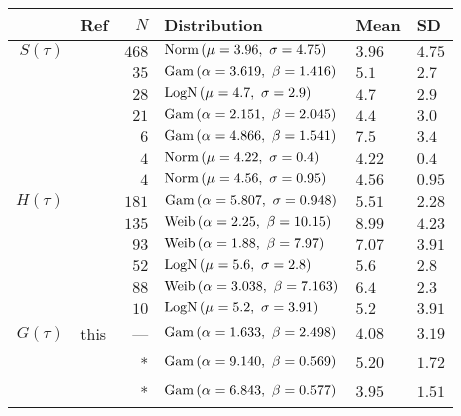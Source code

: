 \centering
{\small
\begin{tabular}{rlrlll}
	\toprule
	          & Ref                 &   $N$ & Distribution                           & Mean   & SD     \\
	\midrule
	$S(\tau)$ & \citet{Du2020}       & $468$ & $\mathop{\mathrm{Norm}}{\left(\mu=3.96,~\sigma=4.75\right)}$     & $3.96$ & $4.75$ \\
	          & \citet{Zhang2020}    &  $35$ & $\mathop{\mathrm{Gam}}{\left(\alpha=3.619,~\beta=1.416\right)}$  & $5.1$  & $2.7$  \\
	          & \citet{Nishiura2020} &  $28$ & $\mathop{\mathrm{LogN}}{\left(\mu=4.7,~\sigma=2.9\right)}$       & $4.7$  & $2.9$  \\
	          & \citet{Zhao2020}     &  $21$ & $\mathop{\mathrm{Gam}}{\left(\alpha=2.151,~\beta=2.045\right)}$  & $4.4$  & $3.0$  \\
	          & \citet{Li2020}       &   $6$ & $\mathop{\mathrm{Gam}}{\left(\alpha=4.866,~\beta=1.541\right)}$  & $7.5$  & $3.4$  \\
	          & \citet{Tindale2020}  &   $4$ & $\mathop{\mathrm{Norm}}{\left(\mu=4.22,~\sigma=0.4\right)}$      & $4.22$ & $0.4$  \\
	          & \citet{Tindale2020}  &   $4$ & $\mathop{\mathrm{Norm}}{\left(\mu=4.56,~\sigma=0.95\right)}$     & $4.56$ & $0.95$ \\
	\midrule
	$H(\tau)$ & \citet{Lauer2020}    & $181$ & $\mathop{\mathrm{Gam}}{\left(\alpha=5.807,~\sigma=0.948\right)}$ & $5.51$ & $2.28$ \\
	          & \citet{Tindale2020}  & $135$ & $\mathop{\mathrm{Weib}}{\left(\alpha=2.25,~\beta=10.15\right)}$  & $8.99$ & $4.23$ \\
	          & \citet{Tindale2020}  &  $93$ & $\mathop{\mathrm{Weib}}{\left(\alpha=1.88,~\beta=7.97\right)}$   & $7.07$ & $3.91$ \\
	          & \citet{Linton2020}   &  $52$ & $\mathop{\mathrm{LogN}}{\left(\mu=5.6,~\sigma=2.8\right)}$       & $5.6$  & $2.8$  \\
	          & \citet{Backer2020}   &  $88$ & $\mathop{\mathrm{Weib}}{\left(\alpha=3.038,~\beta=7.163\right)}$ & $6.4$  & $2.3$  \\
	          & \citet{Li2020}       &  $10$ & $\mathop{\mathrm{LogN}}{\left(\mu=5.2,~\sigma=3.91\right)}$      & $5.2$  & $3.91$ \\
	\midrule
	$G(\tau)$ & this                 &   --- & $\mathop{\mathrm{Gam}}{\left(\alpha=1.633,~\beta=2.498\right)}$  & $4.08$ & $3.19$ \\
	          & \citet{Ganyani2020}  &     * & $\mathop{\mathrm{Gam}}{\left(\alpha=9.140,~\beta=0.569\right)}$  & $5.20$ & $1.72$ \\
	          & \citet{Ganyani2020}  &     * & $\mathop{\mathrm{Gam}}{\left(\alpha=6.843,~\beta=0.577\right)}$  & $3.95$ & $1.51$ \\
	\bottomrule
\end{tabular}}
